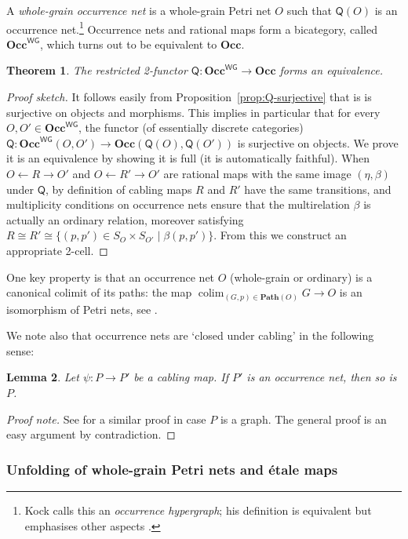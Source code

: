 \documentclass[11pt,a4paper]{article}
\theoremstyle{plain}
\newtheorem{theorem}{Theorem}[section]
\newtheorem{lemma}[theorem]{Lemma}
\theoremstyle{definition}
\theoremstyle{remark}
\newcommand{\Occ}{\mathbf{Occ}}
\newcommand{\WGOcc}{\mathbf{Occ}^{\mathsf{WG}}}
\newcommand{\Q}{\mathsf{Q}}
\DeclareMathOperator*{\colim}{colim}
\newcommand{\Path}{\mathbf{Path}}
\begin{document}
A \emph{whole-grain occurrence net} is a whole-grain Petri net $O$ such that $\Q(O)$ is an occurrence net.\footnote{Kock calls this an \emph{occurrence hypergraph}; his
    definition is equivalent but emphasises other aspects \cite{WGPN}.} Occurrence nets and rational maps form a bicategory, called $\WGOcc$, which turns out to be equivalent to $\Occ$.
\begin{theorem}
  The restricted 2-functor $\Q : \WGOcc \rightarrow \Occ$ forms an equivalence. 
\end{theorem}
\begin{proof}[Proof sketch]
  It follows easily from Proposition~\ref{prop:Q-surjective} that is is surjective on objects and morphisms. This implies in particular that for every $O, O' \in \WGOcc$, the functor (of essentially discrete categories) $\Q : \WGOcc(O, O') \to \Occ(\Q(O), \Q(O'))$ is surjective on objects. We prove it is an equivalence by showing it is full (it is automatically faithful). 
 When $O \leftarrow R \rightarrow O'$ and  $O \leftarrow R' \rightarrow O'$ are rational maps with the same image $(\eta, \beta)$ under $\Q$, by definition of cabling maps $R$ and $R'$ have the same transitions, and multiplicity conditions on occurrence nets ensure that the multirelation $\beta$ is  actually an ordinary relation, moreover satisfying $R \cong R' \cong \{ (p, p') \in S_O \times S_{O'} \mid \beta(p, p') \}$. From this we construct an appropriate 2-cell.
 \end{proof}


One key property is that an occurrence net $O$ (whole-grain or ordinary) is a canonical colimit of its paths: the map $\colim_{(G, p) \in \Path(O)} G \to O$ is an isomorphism of Petri nets, see \cite[Proposition 8.15]{WGPN}. 

We note also that occurrence nets are `closed under cabling' in the following sense:
\begin{lemma}
\label{lem:cabling-to-occ}
   Let $\psi : P \rightarrow P'$ be a cabling map. If $P'$ is an occurrence net, then so is $P$.
\end{lemma}
\begin{proof}[Proof note]
See \cite{WGPN} for a similar proof in case $P$ is a graph. The general proof is an easy argument by contradiction.
\end{proof}


\color{black}
\subsubsection{Unfolding of whole-grain Petri nets and \'etale maps}
\end{document}
